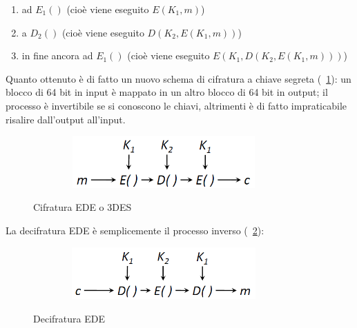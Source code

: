 \begin{enumerate}
	\item ad $E_{1}()$ (cioè viene eseguito $E(K_{1}, m)$)
	\item a $D_{2}()$ (cioè viene eseguito $D(K_{2}, E(K_{1}, m))$)
	\item in fine ancora ad $E_{1}()$ (cioè viene eseguito $E(K_{1}, D(K_{2},E(K_{1}, m)))$)
\end{enumerate}
Quanto ottenuto è di fatto un nuovo schema di cifratura a chiave segreta (\figurename ~\ref{fig:EDE}): un blocco di 64 bit in input è mappato in un altro blocco di 64 bit in output; il processo è invertibile se si conoscono le chiavi, altrimenti è di fatto impraticabile risalire dall'output all'input.
\begin{figure}[htbp]
	\centering%
	\subfigure%
	{\includegraphics[height=2cm, width=10cm, keepaspectratio]{Immagini/modalita_operative/EDE.png}}
	\caption{Cifratura EDE o 3DES \label{fig:EDE}} 	
\end{figure}
La decifratura EDE è semplicemente il processo inverso (\figurename ~\ref{fig:DED}):
\begin{figure}[htbp]
	\centering%
	\subfigure%
	{\includegraphics[height=2cm, width=10cm, keepaspectratio]{Immagini/modalita_operative/DED.png}}
	\caption{Decifratura EDE \label{fig:DED}} 	
\end{figure}
